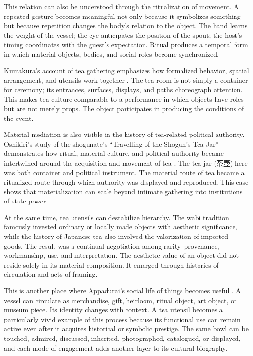 \documentclass[numbers]{IntechOpen-Book}
\newcommand{\jp}[1]{{\CJKfontspec{Noto Serif CJK JP}\upshape #1}}
\begin{document}
This relation can also be understood through the ritualization of movement. A repeated gesture becomes meaningful not only because it symbolizes something but because repetition changes the body's relation to the object. The hand learns the weight of the vessel; the eye anticipates the position of the spout; the host's timing coordinates with the guest's expectation. Ritual produces a temporal form in which material objects, bodies, and social roles become synchronized.

Kumakura's account of tea gathering emphasizes how formalized behavior, spatial arrangement, and utensils work together \cite{kumakura}. The tea room is not simply a container for ceremony; its entrances, surfaces, displays, and paths choreograph attention. This makes tea culture comparable to a performance in which objects have roles but are not merely props. The object participates in producing the conditions of the event.

Material mediation is also visible in the history of tea-related political authority. Oshikiri's study of the shogunate's ``Travelling of the Shogun's Tea Jar'' demonstrates how ritual, material culture, and political authority became intertwined around the acquisition and movement of tea \cite{oshikiri}. The tea jar (\jp{茶壺}) here was both container and political instrument. The material route of tea became a ritualized route through which authority was displayed and reproduced. This case shows that materialization can scale beyond intimate gathering into institutions of state power.

At the same time, tea utensils can destabilize hierarchy. The wabi tradition famously invested ordinary or locally made objects with aesthetic significance, while the history of Japanese tea also involved the valorization of imported goods. The result was a continual negotiation among rarity, provenance, workmanship, use, and interpretation. The aesthetic value of an object did not reside solely in its material composition. It emerged through histories of circulation and acts of framing.

This is another place where Appadurai's social life of things becomes useful \cite{appadurai}. A vessel can circulate as merchandise, gift, heirloom, ritual object, art object, or museum piece. Its identity changes with context. A tea utensil becomes a particularly vivid example of this process because its functional use can remain active even after it acquires historical or symbolic prestige. The same bowl can be touched, admired, discussed, inherited, photographed, catalogued, or displayed, and each mode of engagement adds another layer to its cultural biography.
\end{document}
